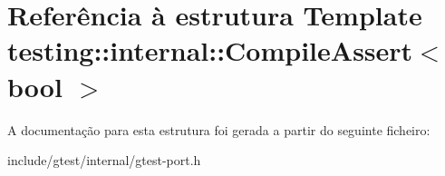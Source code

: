 \hypertarget{structtesting_1_1internal_1_1CompileAssert}{\section{Referência à estrutura Template testing\-:\-:internal\-:\-:Compile\-Assert$<$ bool $>$}
\label{structtesting_1_1internal_1_1CompileAssert}
}


A documentação para esta estrutura foi gerada a partir do seguinte ficheiro\-:\begin{DoxyCompactItemize}
\item 
include/gtest/internal/gtest-\/port.\-h\end{DoxyCompactItemize}
